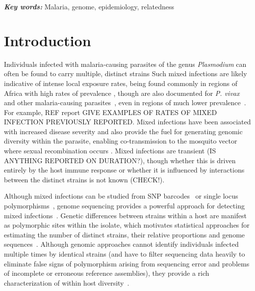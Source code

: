 \documentclass[9pt,lineno]{elife}
\providecommand{\keywords}[1]{\textbf{\textit{Key words:}} #1}
\begin{document}
\keywords{Malaria, genome, epidemiology, relatedness}


\section{Introduction}


Individuals infected with malaria-causing parasites of the genus {\it Plasmodium} can often be found to carry multiple, distinct strains \citep{Bell2006}  Such mixed infections are likely indicative of intense local exposure rates, being found commonly in regions of Africa with high rates of prevalence \citep{Bhatt2015, Howes2016}, though are also documented for {\it P. vivax} and other malaria-causing parasites~\citep{Mueller2007, Collins2012}, even in regions of much lower prevalence~\citep{Howes2016, Steenkeste2010}.  For example, REF report GIVE EXAMPLES OF RATES OF MIXED INFECTION PREVIOUSLY REPORTED.  Mixed infections have been associated with increased disease severity \citep{deRoode2005} and also provide the fuel for generating genomic diversity within the parasite, enabling co-transmission to the mosquito vector where sexual recombination occurs \citep{Mzilahowa2007}.  Mixed infections are transient (IS ANYTHING REPORTED ON DURATION?), though whether this is driven entirely by the host immune response or whether it is influenced by interactions between the distinct strains is not known (CHECK!).

Although mixed infections can be studied from SNP barcodes~\citep{Galinsky2015} or single locus polymorphisms~\citep{Jack2016}, genome sequencing provides a powerful approach for detecting mixed infections~\citep{Chang2017}.  Genetic differences between strains within a host are manifest as polymorphic sites within the isolate, which motivates statistical approaches for estimating the number of distinct strains, their relative proportions and genome sequences~\citep{Zhu2017}.  Although genomic approaches cannot identify individuals infected multiple times by identical strains (and have to filter sequencing data heavily to eliminate false signs of polymorphism arising from sequencing error and problems of incomplete or erroneous reference assemblies), they provide a rich characterization of within host diversity~\citep{Manske2012}.
\end{document}
